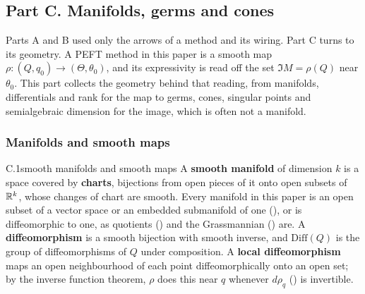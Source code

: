 \providecommand{\fbAusedin}[1]{\par\smallskip\noindent{\small\color{inkgray}{\sffamily\bfseries\color{tide}Used in.}\enspace #1\par}\medskip}

\subsection*{Part C. Manifolds, germs and cones}
\label{app:bg-c}

Parts A and B used only the arrows of a method and its wiring. Part C turns to its geometry. A PEFT method in this paper
is a smooth map $\rho:(Q,q_0)\to(\Theta,\theta_0)$, and its expressivity is read off the set $\Im M=\rho(Q)$ near
$\theta_0$. This part collects the geometry behind that reading, from manifolds, differentials and rank for the map to
germs, cones, singular points and semialgebraic dimension for the image, which is often not a manifold.

\subsubsection*{Manifolds and smooth maps}

\begin{bgentry}{C.1}{smooth manifolds and smooth maps}
A \textbf{smooth manifold} of dimension $k$ is a space covered by \textbf{charts}, bijections from open pieces of it
onto open subsets of $\mathbb{R}^k$, whose changes of chart are smooth. Every manifold in this paper is an open subset of a
vector space or an embedded submanifold of one (), or is diffeomorphic to one, as quotients ()
and the Grassmannian () are. A \textbf{diffeomorphism} is a smooth bijection with smooth inverse, and
$\mathrm{Diff}(Q)$ is the group of diffeomorphisms of $Q$ under composition. A \textbf{local diffeomorphism} maps an
open neighbourhood of each point diffeomorphically onto an open set; by the inverse function theorem, $\rho$ does this
near $q$ whenever $d\rho_q$ () is invertible.
\end{bgentry}

